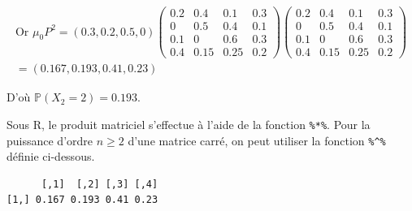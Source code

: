 \documentclass[
]{book}
\newenvironment{Shaded}{\begin{snugshade}}{\end{snugshade}}
\newcommand{\CommentTok}[1]{\textcolor[rgb]{0.56,0.35,0.01}{\textit{#1}}}
\newcommand{\DataTypeTok}[1]{\textcolor[rgb]{0.13,0.29,0.53}{#1}}
\newcommand{\DecValTok}[1]{\textcolor[rgb]{0.00,0.00,0.81}{#1}}
\newcommand{\FloatTok}[1]{\textcolor[rgb]{0.00,0.00,0.81}{#1}}
\newcommand{\KeywordTok}[1]{\textcolor[rgb]{0.13,0.29,0.53}{\textbf{#1}}}
\newcommand{\NormalTok}[1]{#1}
\newcommand{\OperatorTok}[1]{\textcolor[rgb]{0.81,0.36,0.00}{\textbf{#1}}}
\theoremstyle{definition}
\theoremstyle{definition}
\theoremstyle{definition}
\theoremstyle{remark}
\begin{document}
\begin{align*}
\text{Or } \mu_0 P^2=(0.3,0.2,0.5,0) \left( 
  \begin{array}{cccc}
  0.2 & 0.4 & 0.1 & 0.3\\
  0 & 0.5 & 0.4 & 0.1\\
  0.1 & 0 & 0.6 & 0.3\\
  0.4 & 0.15 & 0.25 & 0.2
  \end{array}
    \right) \left( 
  \begin{array}{cccc}
  0.2 & 0.4 & 0.1 & 0.3\\
  0 & 0.5 & 0.4 & 0.1\\
  0.1 & 0 & 0.6 & 0.3\\
  0.4 & 0.15 & 0.25 & 0.2
  \end{array}
    \right)\\
    = (0.167,0.193,0.41,0.23)\qquad \qquad \qquad \qquad \qquad \qquad \qquad \qquad \qquad \quad \;
\end{align*}

D'où \(\mathbb{P}(X_2=2)=0.193\).

Sous R, le produit matriciel s'effectue à l'aide de la fonction \texttt{\%*\%}. Pour la puissance d'ordre \(n \geq 2\) d'une matrice carré, on peut utiliser la fonction \texttt{\%\^{}\%} définie ci-dessous.

\begin{Shaded}
\end{Shaded}

\begin{verbatim}
      [,1]  [,2] [,3] [,4]
[1,] 0.167 0.193 0.41 0.23
\end{verbatim}
\end{document}

